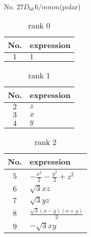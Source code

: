 \documentclass[fleqn,8pt,landscape]{jsarticle}
\begin{document}
\setcounter{MaxMatrixCols}{16}

\begin{center}
\LARGE
No. 27\quad$D_{6h}$\quad$6/mmm$\quad[ hexagonal ] (polar)
\end{center}
\begin{table}[ht!]
\begin{center}
\caption{rank 0}
\renewcommand{\arraystretch}{1.3}
\begin{tabular}{cl} \hline \hline
No. & expression \\ \hline
$ 1 $ & $ 1 $ \\
 \hline \hline
\end{tabular}
\end{center}
\end{table}
\begin{table}[ht!]
\begin{center}
\caption{rank 1}
\renewcommand{\arraystretch}{1.3}
\begin{tabular}{cl} \hline \hline
No. & expression \\ \hline
$ 2 $ & $ z $ \\
$ 3 $ & $ x $ \\
$ 4 $ & $ y $ \\
 \hline \hline
\end{tabular}
\end{center}
\end{table}
\begin{table}[ht!]
\begin{center}
\caption{rank 2}
\renewcommand{\arraystretch}{1.3}
\begin{tabular}{cl} \hline \hline
No. & expression \\ \hline
$ 5 $ & $ - \frac{x^{2}}{2} - \frac{y^{2}}{2} + z^{2} $ \\
$ 6 $ & $ \sqrt{3} x z $ \\
$ 7 $ & $ \sqrt{3} y z $ \\
$ 8 $ & $ \frac{\sqrt{3} \left(x - y\right) \left(x + y\right)}{2} $ \\
$ 9 $ & $ - \sqrt{3} x y $ \\
 \hline \hline
\end{tabular}
\end{center}
\end{table}
\end{document}
